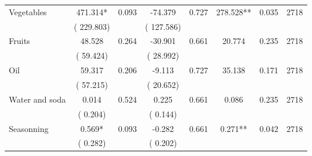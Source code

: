 \begin{tabular}{l*{7}{c}}
 Vegetables       &            471.314*       &        0.093  &            -74.379       &        0.727  &            278.528**       &              0.035 &  2718 \\ 
                       &       (     229.803)             &                               &       (     127.586)                     &                               &                                               &                                &                      \\ 

 Fruits       &             48.528       &        0.264  &            -30.901       &        0.661  &             20.774       &              0.235 &  2718 \\ 
                       &       (      59.424)             &                               &       (      28.992)                     &                               &                                               &                                &                      \\ 

 Oil       &             59.317       &        0.206  &             -9.113       &        0.727  &             35.138       &              0.171 &  2718 \\ 
                       &       (      57.215)             &                               &       (      20.652)                     &                               &                                               &                                &                      \\ 

 Water and soda       &              0.014       &        0.524  &              0.225       &        0.661  &              0.086       &              0.235 &  2718 \\ 
                       &       (       0.204)             &                               &       (       0.144)                     &                               &                                               &                                &                      \\ 

 Seasonning       &              0.569*       &        0.093  &             -0.282       &        0.661  &              0.271**       &              0.042 &  2718 \\ 
                       &       (       0.282)             &                               &       (       0.202)                     &                               &                                               &                                &                      \\ 


\end{tabular}
